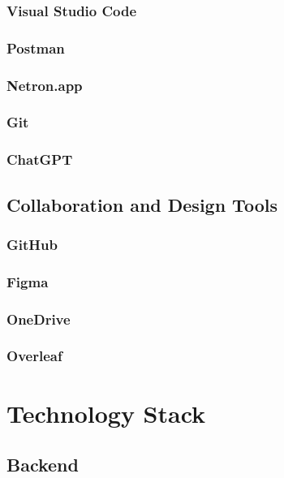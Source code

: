 \subsubsection*{Visual Studio Code}

\subsubsection*{Postman}

\subsubsection*{Netron.app}

\subsubsection*{Git}

\subsubsection*{ChatGPT}

\subsection{Collaboration and Design Tools}

\subsubsection*{GitHub}

\subsubsection*{Figma}

\subsubsection*{OneDrive}

\subsubsection*{Overleaf}

\section{Technology Stack}
\label{sec:tech-stack}

\subsection{Backend}
